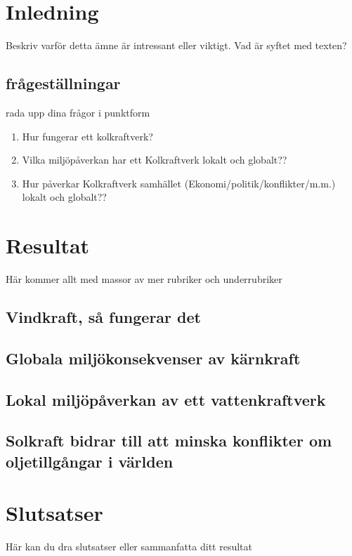 \documentclass[11p]{article}
\begin{document}
    \section{Inledning}
    Beskriv varför detta ämne är intressant eller viktigt. Vad är syftet med texten?
    \subsection{frågeställningar}
    rada upp dina frågor i punktform
    \begin{enumerate}
        \item Hur fungerar ett kolkraftverk?
        \item Vilka miljöpåverkan har ett Kolkraftverk lokalt och globalt??
        \item Hur påverkar Kolkraftverk samhället (Ekonomi/politik/konflikter/m.m.) lokalt och globalt??
    \end{enumerate}

    \section{Resultat}
    Här kommer allt med massor av mer rubriker och underrubriker
    \subsection{Vindkraft, så fungerar det}
    \subsection{Globala miljökonsekvenser av kärnkraft}
    \subsection{Lokal miljöpåverkan av ett vattenkraftverk}
    \subsection{Solkraft bidrar till att minska konflikter om oljetillgångar i världen}
    \subsection{}

    \section{Slutsatser}
    Här kan du dra slutsatser eller sammanfatta ditt resultat
\end{document}
